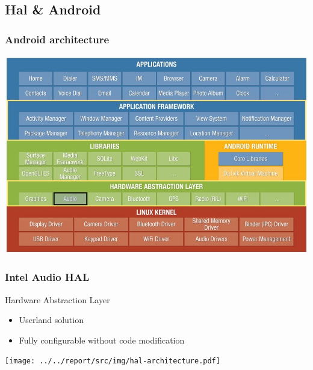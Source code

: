 \subsection{Hal \& Android}
\begin{frame}
    \frametitle{Android architecture}
    \includegraphics[width=\textwidth]{../../report/src/img/android-archi-audio-hal.jpeg}
\end{frame}

\begin{frame}
    \frametitle{Intel Audio HAL}
    \begin{minipage}{0.40\textwidth}
        \begin{block}{Hardware Abstraction Layer}
            \begin{itemize}
                \item Userland solution
                \item Fully configurable without code modification
            \end{itemize}
        \end{block}
    \end{minipage}
    \begin{minipage}{0.50\textwidth}
        \flushright
        \texttt{[image: ../../report/src/img/hal-architecture.pdf]}
    \end{minipage}
\end{frame}


